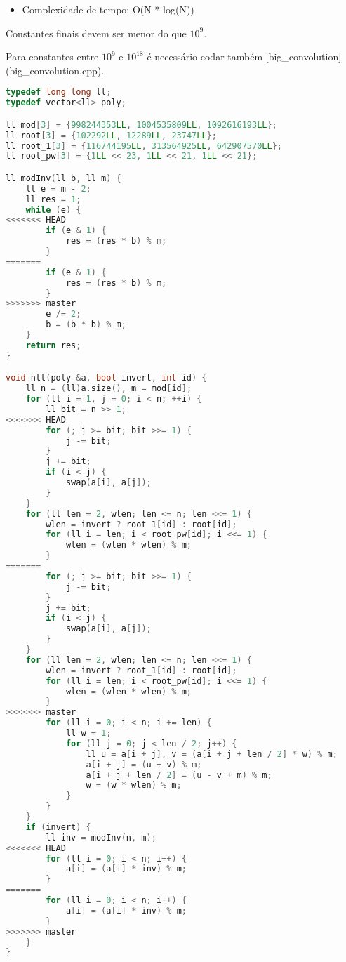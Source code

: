 \documentclass[11pt, a4paper, oneside]{book}
\begin{document}
\begin{itemize}
\item Complexidade de tempo: O(N * log(N))
\end{itemize}



Constantes finais devem ser menor do que $10^9$.  

Para constantes entre $10^9$ e $10^{18}$ é necessário codar também [big\_convolution](big\_convolution.cpp).

\hfill

\begin{multicols}{2}
\begin{lstlisting}[language=C++]
typedef long long ll;
typedef vector<ll> poly;

ll mod[3] = {998244353LL, 1004535809LL, 1092616193LL};
ll root[3] = {102292LL, 12289LL, 23747LL};
ll root_1[3] = {116744195LL, 313564925LL, 642907570LL};
ll root_pw[3] = {1LL << 23, 1LL << 21, 1LL << 21};

ll modInv(ll b, ll m) {
    ll e = m - 2;
    ll res = 1;
    while (e) {
<<<<<<< HEAD
        if (e & 1) {
            res = (res * b) % m;
        }
=======
        if (e & 1) {
            res = (res * b) % m;
        }
>>>>>>> master
        e /= 2;
        b = (b * b) % m;
    }
    return res;
}

void ntt(poly &a, bool invert, int id) {
    ll n = (ll)a.size(), m = mod[id];
    for (ll i = 1, j = 0; i < n; ++i) {
        ll bit = n >> 1;
<<<<<<< HEAD
        for (; j >= bit; bit >>= 1) {
            j -= bit;
        }
        j += bit;
        if (i < j) {
            swap(a[i], a[j]);
        }
    }
    for (ll len = 2, wlen; len <= n; len <<= 1) {
        wlen = invert ? root_1[id] : root[id];
        for (ll i = len; i < root_pw[id]; i <<= 1) {
            wlen = (wlen * wlen) % m;
        }
=======
        for (; j >= bit; bit >>= 1) {
            j -= bit;
        }
        j += bit;
        if (i < j) {
            swap(a[i], a[j]);
        }
    }
    for (ll len = 2, wlen; len <= n; len <<= 1) {
        wlen = invert ? root_1[id] : root[id];
        for (ll i = len; i < root_pw[id]; i <<= 1) {
            wlen = (wlen * wlen) % m;
        }
>>>>>>> master
        for (ll i = 0; i < n; i += len) {
            ll w = 1;
            for (ll j = 0; j < len / 2; j++) {
                ll u = a[i + j], v = (a[i + j + len / 2] * w) % m;
                a[i + j] = (u + v) % m;
                a[i + j + len / 2] = (u - v + m) % m;
                w = (w * wlen) % m;
            }
        }
    }
    if (invert) {
        ll inv = modInv(n, m);
<<<<<<< HEAD
        for (ll i = 0; i < n; i++) {
            a[i] = (a[i] * inv) % m;
        }
=======
        for (ll i = 0; i < n; i++) {
            a[i] = (a[i] * inv) % m;
        }
>>>>>>> master
    }
}


\end{lstlisting}
\end{multicols}
\end{document}
